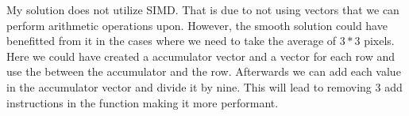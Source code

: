 My solution does not utilize SIMD. That is due to not using vectors that we can perform arithmetic operations upon. However, the smooth
solution could have benefitted from it in the cases where we need to take the average of $3 * 3$ pixels. Here we could have created a accumulator vector
and a vector for each row and use the \code{+} between the accumulator and the row. Afterwards we can add each value in the accumulator vector and divide it by nine.
This will lead to removing 3 add instructions in the  function making it more performant.

